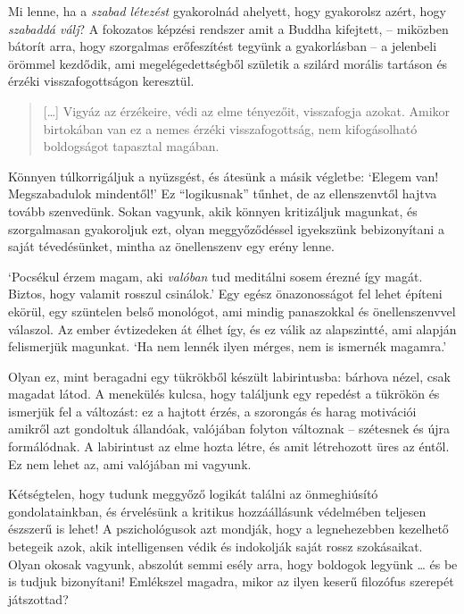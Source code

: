 \clearpage
\normalpagelayout

Mi lenne, ha a \emph{szabad létezést} gyakorolnád ahelyett, hogy
gyakorolsz azért, hogy \emph{szabaddá válj}? A fokozatos képzési
rendszer amit a Buddha kifejtett, -- miközben bátorít arra, hogy
szorgalmas erőfeszítést tegyünk a gyakorlásban -- a jelenbeli örömmel
kezdődik, ami megelégedettségből születik a szilárd morális tartáson és
érzéki visszafogottságon keresztül.

\begin{quote}
{[}\ldots{]} Vigyáz az érzékeire, védi az elme tényezőit, visszafogja
azokat. Amikor birtokában van ez a nemes érzéki visszafogottság, nem
kifogásolható boldogságot tapasztal magában.

\bigskip

\end{quote}


Könnyen túlkorrigáljuk a nyüzsgést, és átesünk a másik végletbe: `Elegem
van! Megszabadulok mindentől!' Ez ``logikusnak'' tűnhet, de az
ellenszenvtől hajtva tovább szenvedünk. Sokan vagyunk, akik könnyen
kritizáljuk magunkat, és szorgalmasan gyakoroljuk ezt, olyan
meggyőződéssel igyekszünk bebizonyítani a saját tévedésünket, mintha az
önellenszenv egy erény lenne.

`Pocsékul érzem magam, aki \emph{valóban} tud meditálni sosem érezné így
magát. Biztos, hogy valamit rosszul csinálok.' Egy egész önazonosságot
fel lehet építeni ekörül, egy szüntelen belső monológot, ami mindig
panaszokkal és önellenszenvvel válaszol. Az ember évtizedeken át élhet
így, és ez válik az alapszintté, ami alapján felismerjük magunkat. `Ha
nem lennék ilyen mérges, nem is ismernék magamra.'

Olyan ez, mint beragadni egy tükrökből készült labirintusba: bárhova
nézel, csak magadat látod. A menekülés kulcsa, hogy találjunk egy
repedést a tükrökön és ismerjük fel a változást: ez a hajtott érzés, a
szorongás és harag motivációi amikről azt gondoltuk állandóak, valójában
folyton változnak -- szétesnek és újra formálódnak. A labirintust az
elme hozta létre, és amit létrehozott üres az éntől. Ez nem lehet az,
ami valójában mi vagyunk.

Kétségtelen, hogy tudunk meggyőző logikát találni az önmeghiúsító
gondolatainkban, és érvelésünk a kritikus hozzáállásunk védelmében
teljesen észszerű is lehet! A pszichológusok azt mondják, hogy a
legnehezebben kezelhető betegeik azok, akik intelligensen védik és
indokolják saját rossz szokásaikat. Olyan okosak vagyunk, abszolút semmi
esély arra, hogy boldogok legyünk \ldots{} és be is tudjuk bizonyítani!
Emlékszel magadra, mikor az ilyen keserű filozófus szerepét játszottad?

